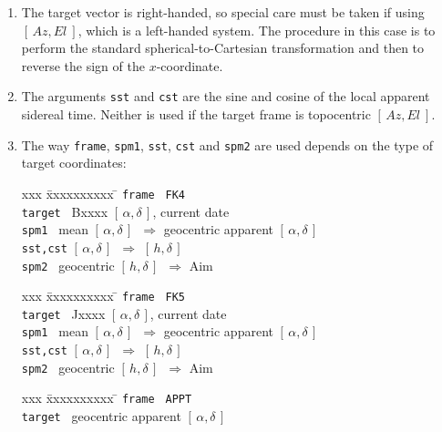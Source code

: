 \documentclass[12pt,fleqn,twoside]{article}
\renewcommand{\_}{{\tt\char'137}}     %
\newcommand{\radec}     {$[\,\alpha,\delta\,]$}
\newcommand{\hadec}     {$[\,h,\delta\,]$}
\newcommand{\azel}      {$[\,Az,El~]$}
\begin{document}
{\begin{enumerate}
      In the present case, the encoder demands required to image the
      specified sky target at the specified pointing-origin are
      calculated.  The {\sc Aim} vector, an intermediate result, is also
      returned, so that it can be used in a subsequent call to the
      {\tt tcsRotator} function.
\item The target vector is right-handed, so special care must be taken
      if using \azel, which is a left-handed system.  The procedure in
      this case is to perform the standard spherical-to-Cartesian
      transformation and then to reverse the sign of the $x$-coordinate.
\item The arguments {\tt sst} and {\tt cst}
      are the sine and cosine of the local
      apparent sidereal time.  Neither is used if the target frame is
      topocentric \azel.
\item The way {\tt frame}, {\tt spm1}, {\tt sst}, {\tt cst} and
      {\tt spm2} are used depends on the type of target coordinates:
      \begin{tabbing}
         xxx \= xxxxxxxxxx \= \kill
         \> {\tt frame  } \> {\tt FK4} \\
         \> {\tt target } \> Bxxxx \radec, current date \\
         \> {\tt spm1   } \>
                 mean \radec\ $\Rightarrow$ geocentric apparent \radec \\
         \> {\tt sst,cst} \> \radec\ $\Rightarrow$ \hadec \\
         \> {\tt spm2   } \>  geocentric \hadec\ $\Rightarrow$ {\sc Aim}
      \end{tabbing}
      \begin{tabbing}
         xxx \= xxxxxxxxxx \= \kill
         \> {\tt frame  } \> {\tt FK5} \\
         \> {\tt target } \> Jxxxx \radec, current date \\
         \> {\tt spm1   } \>
                 mean \radec\ $\Rightarrow$ geocentric apparent \radec \\
         \> {\tt sst,cst} \> \radec\ $\Rightarrow$ \hadec \\
         \> {\tt spm2   } \> geocentric \hadec\ $\Rightarrow$ {\sc Aim}
      \end{tabbing}
      \begin{tabbing}
         xxx \= xxxxxxxxxx \= \kill
         \> {\tt frame  } \> {\tt APPT} \\
         \> {\tt target } \> geocentric apparent \radec \\

\end{tabbing}
\end{enumerate}}
\end{document}

